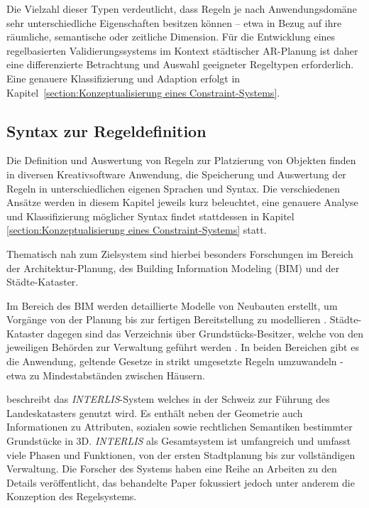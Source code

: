 Die Vielzahl dieser Typen verdeutlicht, dass Regeln je nach Anwendungsdomäne sehr unterschiedliche Eigenschaften besitzen können – etwa in Bezug auf ihre räumliche, semantische oder zeitliche Dimension. Für die Entwicklung eines regelbasierten Validierungssystems im Kontext städtischer AR-Planung ist daher eine differenzierte Betrachtung und Auswahl geeigneter Regeltypen erforderlich. Eine genauere Klassifizierung und Adaption erfolgt in Kapitel~\ref{section:Konzeptualisierung eines Constraint-Systems}.

\subsection{Syntax zur Regeldefinition}

Die Definition und Auswertung von Regeln zur Platzierung von Objekten finden in diversen Kreativsoftware Anwendung, die Speicherung und Auswertung der Regeln in unterschiedlichen eigenen Sprachen und Syntax. Die verschiedenen Ansätze werden in diesem Kapitel jeweils kurz beleuchtet, eine genauere Analyse und Klassifizierung möglicher Syntax findet stattdessen in Kapitel \ref{section:Konzeptualisierung eines Constraint-Systems} statt.

Thematisch nah zum Zielsystem sind hierbei besonders Forschungen im Bereich der Architektur-Planung, des Building Information Modeling (BIM) und der Städte-Kataster.

Im Bereich des BIM werden detaillierte Modelle von Neubauten erstellt, um Vorgänge von der Planung bis zur fertigen Bereitstellung zu modellieren \parencite{tuevsuedagWasIstBIM2025}. Städte-Kataster dagegen sind das Verzeichnis über Grundstücks-Besitzer, welche von den jeweiligen Behörden zur Verwaltung geführt werden \parencite{buettnerWasIstKataster2021}. In beiden Bereichen gibt es die Anwendung, geltende Gesetze in strikt umgesetzte Regeln umzuwandeln - etwa zu Mindestabständen zwischen Häusern.

\medskip

\textcite{kalogianniINTERLISLanguageModelling2017} beschreibt das \textit{INTERLIS}-System welches in der Schweiz zur Führung des Landeskatasters genutzt wird. Es enthält neben der Geometrie auch Informationen zu Attributen, sozialen sowie rechtlichen Semantiken bestimmter Grundstücke in 3D. \textit{INTERLIS} als Gesamtsystem ist umfangreich und umfasst viele Phasen und Funktionen, von der ersten Stadtplanung bis zur vollständigen Verwaltung. Die Forscher des Systems haben eine Reihe an Arbeiten zu den Details veröffentlicht, das behandelte Paper fokussiert jedoch unter anderem die Konzeption des Regelsystems.

